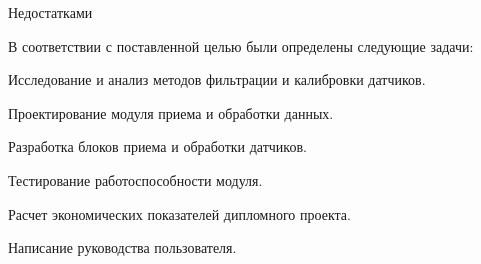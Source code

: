 Недостатками 

В соответствии с поставленной целью были определены следующие задачи:
\begin{enumerate_num}
    \item Исследование и анализ методов фильтрации и калибровки датчиков.
    \item Проектирование модуля приема и обработки данных.
    \item Разработка блоков приема и обработки датчиков.
    \item Тестирование работоспособности модуля.
    \item Расчет экономических показателей дипломного проекта.
    \item Написание руководства пользователя.
\end{enumerate_num}
